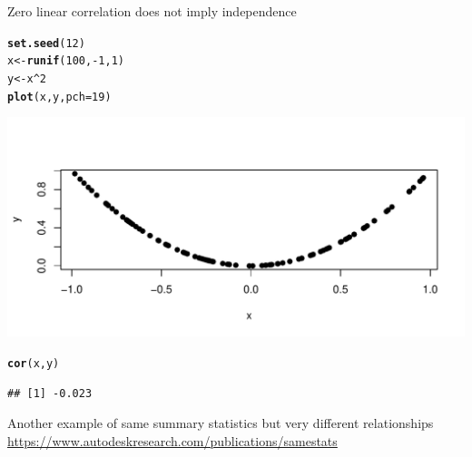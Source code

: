 \documentclass[10pt,handout]{beamer}\usepackage[]{graphicx}\usepackage[]{color}
\makeatletter
\def\maxwidth{ %
  \ifdim\Gin@nat@width>\linewidth
    \linewidth
  \else
    \Gin@nat@width
  \fi
}
\newcommand{\hlnum}[1]{\textcolor[rgb]{0.686,0.059,0.569}{#1}}%
\newcommand{\hlopt}[1]{\textcolor[rgb]{0,0,0}{#1}}%
\newcommand{\hlstd}[1]{\textcolor[rgb]{0.345,0.345,0.345}{#1}}%
\newcommand{\hlkwb}[1]{\textcolor[rgb]{0.69,0.353,0.396}{#1}}%
\newcommand{\hlkwc}[1]{\textcolor[rgb]{0.333,0.667,0.333}{#1}}%
\newcommand{\hlkwd}[1]{\textcolor[rgb]{0.737,0.353,0.396}{\textbf{#1}}}%
\newenvironment{kframe}{%
 \def\at@end@of@kframe{}%
 \ifinner\ifhmode%
  \def\at@end@of@kframe{\end{minipage}}%
  \begin{minipage}{\columnwidth}%
 \fi\fi%
 \def\FrameCommand##1{\hskip\@totalleftmargin \hskip-\fboxsep
 \colorbox{shadecolor}{##1}\hskip-\fboxsep
     \hskip-\linewidth \hskip-\@totalleftmargin \hskip\columnwidth}%
 \MakeFramed {\advance\hsize-\width
   \@totalleftmargin\z@ \linewidth\hsize
   \@setminipage}}%
 {\par\unskip\endMakeFramed%
 \at@end@of@kframe}
\newenvironment{knitrout}{}{} %
\makeatother
\begin{document}
\begin{frame}[fragile]{Zero linear correlation does not imply independence}
\begin{knitrout}\scriptsize
{}\color{fgcolor}\begin{kframe}
\begin{alltt}
\hlkwd{set.seed}\hlstd{(}\hlnum{12}\hlstd{)}
\hlstd{x} \hlkwb{<-} \hlkwd{runif}\hlstd{(}\hlnum{100}\hlstd{,}\hlopt{-}\hlnum{1}\hlstd{,}\hlnum{1}\hlstd{)}
\hlstd{y} \hlkwb{<-} \hlstd{x}\hlopt{^}\hlnum{2}
\hlkwd{plot}\hlstd{(x,y,} \hlkwc{pch} \hlstd{=} \hlnum{19}\hlstd{)}
\end{alltt}
\end{kframe}

{\centering \includegraphics[width=\maxwidth]{figure/unnamed-chunk-8-1} 

}


\begin{kframe}\begin{alltt}
\hlkwd{cor}\hlstd{(x,y)}
\end{alltt}
\begin{verbatim}
## [1] -0.023
\end{verbatim}
\end{kframe}
\end{knitrout}
\end{frame}


\begin{frame}{Another example of same summary statistics but very different relationships}
\url{https://www.autodeskresearch.com/publications/samestats}
\end{frame}
\end{document}
